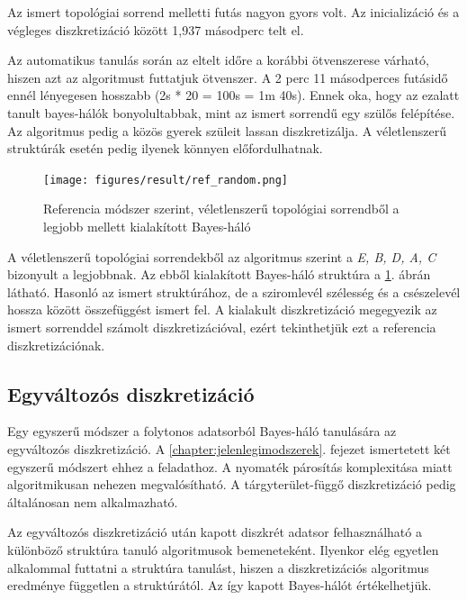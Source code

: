 Az ismert topológiai sorrend melletti futás nagyon gyors volt. Az inicializáció és a végleges diszkretizáció között 1,937 másodperc telt el.

Az automatikus tanulás során az eltelt időre a korábbi ötvenszerese várható, hiszen azt az algoritmust futtatjuk ötvenszer. A 2 perc 11 másodperces futásidő ennél lényegesen hosszabb (2s * 20 = 100s = 1m 40s). Ennek oka, hogy az ezalatt tanult bayes-hálók bonyolultabbak, mint az ismert sorrendű egy szülős felépítése. Az algoritmus pedig a közös gyerek szüleit lassan diszkretizálja. A véletlenszerű struktúrák esetén pedig ilyenek könnyen előfordulhatnak.

\begin{figure}[htp]
    \centering
    \texttt{[image: figures/result/ref\_random.png]}
    \caption{Referencia módszer szerint, véletlenszerű topológiai sorrendből a legjobb mellett kialakított Bayes-háló}
    \label{fig:eredmeny-referencia-random}
\end{figure}

A véletlenszerű topológiai sorrendekből az algoritmus szerint a \emph{E, B, D, A, C} bizonyult a legjobbnak. Az ebből kialakított Bayes-háló struktúra a \ref{fig:eredmeny-referencia-random}. ábrán látható. Hasonló az ismert struktúrához, de a sziromlevél szélesség és a csészelevél hossza között összefüggést ismert fel. A kialakult diszkretizáció megegyezik az ismert sorrenddel számolt diszkretizációval, ezért tekinthetjük ezt a referencia diszkretizációnak.

\subsection{Egyváltozós diszkretizáció}
Egy egyszerű módszer a folytonos adatsorból Bayes-háló tanulására az egyváltozós diszkretizáció. A \ref{chapter:jelenlegimodszerek}. fejezet ismertetett két egyszerű módszert ehhez a feladathoz. A nyomaték párosítás komplexitása miatt algoritmikusan nehezen megvalósítható. A tárgyterület-függő diszkretizáció pedig általánosan nem alkalmazható.

Az egyváltozós diszkretizáció után kapott diszkrét adatsor felhasználható a különböző struktúra tanuló algoritmusok bemeneteként. Ilyenkor elég egyetlen alkalommal futtatni a struktúra tanulást, hiszen a diszkretizációs algoritmus eredménye független a struktúrától. Az így kapott Bayes-hálót értékelhetjük.

